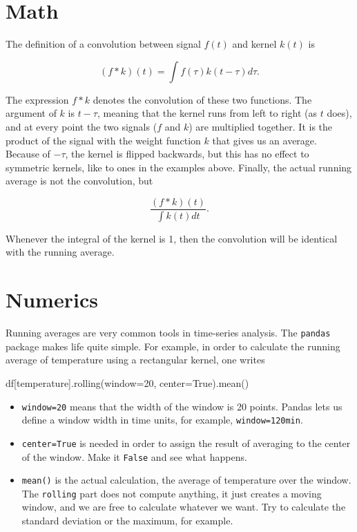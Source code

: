 \documentclass[
  letterpaper,
  DIV=11,
  numbers=noendperiod,
  oneside]{scrreprt}
\newenvironment{Shaded}{\begin{snugshade}}{\end{snugshade}}
\newcommand{\NormalTok}[1]{\textcolor[rgb]{0.00,0.23,0.31}{#1}}
\newcommand{\OperatorTok}[1]{\textcolor[rgb]{0.37,0.37,0.37}{#1}}
\newcommand{\StringTok}[1]{\textcolor[rgb]{0.13,0.47,0.30}{#1}}
\newcommand{\VariableTok}[1]{\textcolor[rgb]{0.07,0.07,0.07}{#1}}
\providecommand{\tightlist}{%
  \setlength{\itemsep}{0pt}\setlength{\parskip}{0pt}}\usepackage{longtable,booktabs,array}
\begin{document}
\hypertarget{math}{%
\section{Math}\label{math}}

The definition of a convolution between signal \(f(t)\) and kernel
\(k(t)\) is

\[
(f * k)(t) = \int f(\tau)k(t-\tau)d\tau.
\]

The expression \(f*k\) denotes the convolution of these two functions.
The argument of \(k\) is \(t-\tau\), meaning that the kernel runs from
left to right (as \(t\) does), and at every point the two signals (\(f\)
and \(k\)) are multiplied together. It is the product of the signal with
the weight function \(k\) that gives us an average. Because of
\(-\tau\), the kernel is flipped backwards, but this has no effect to
symmetric kernels, like to ones in the examples above. Finally, the
actual running average is not the convolution, but

\[
\frac{(f * k)(t)}{\displaystyle \int k(t)dt}.
\]

Whenever the integral of the kernel is 1, then the convolution will be
identical with the running average.

\hypertarget{numerics}{%
\section{Numerics}\label{numerics}}

Running averages are very common tools in time-series analysis. The
\texttt{pandas} package makes life quite simple. For example, in order
to calculate the running average of temperature using a rectangular
kernel, one writes

\begin{Shaded}
\begin{Highlighting}[]
\NormalTok{df[}\StringTok{\textquotesingle{}temperature\textquotesingle{}}\NormalTok{].rolling(window}\OperatorTok{=}\StringTok{\textquotesingle{}20\textquotesingle{}}\NormalTok{, center}\OperatorTok{=}\VariableTok{True}\NormalTok{).mean()}
\end{Highlighting}
\end{Shaded}

\begin{itemize}
\tightlist
\item
  \texttt{window=20} means that the width of the window is 20 points.
  Pandas lets us define a window width in time units, for example,
  \texttt{window=\textquotesingle{}120min\textquotesingle{}}.
\item
  \texttt{center=True} is needed in order to assign the result of
  averaging to the center of the window. Make it \texttt{False} and see
  what happens.
\item
  \texttt{mean()} is the actual calculation, the average of temperature
  over the window. The \texttt{rolling} part does not compute anything,
  it just creates a moving window, and we are free to calculate whatever
  we want. Try to calculate the standard deviation or the maximum, for
  example.
\end{itemize}
\end{document}
